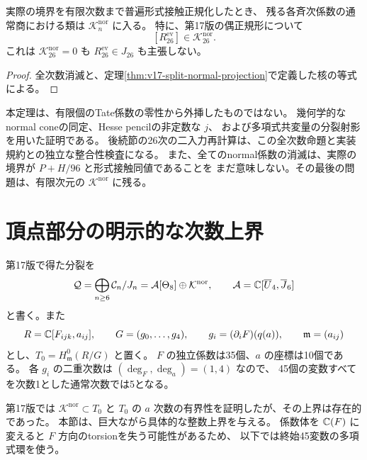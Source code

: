 \begin{corollary}[全ての実際の剰余類が入る部分]
\label{cor:v18-all-actual-classes-vertex}
実際の境界を有限次数まで普遍形式接触正規化したとき、
残る各斉次係数の通常商における類は $\mathcal K_n^{\mathrm{nor}}$ に入る。
特に、第17版の偶正規形について
\[
 [R_{26}^{\mathrm{ev}}]\in\mathcal K_{26}^{\mathrm{nor}}.
\]
これは $\mathcal K_{26}^{\mathrm{nor}}=0$ も $R_{26}^{\mathrm{ev}}\in J_{26}$ も主張しない。
\end{corollary}

\begin{proof}
全次数消滅と、定理\ref{thm:v17-split-normal-projection}で定義した核の等式による。
\end{proof}

\begin{remark}[全次数の証明と有限計算の役割]
本定理は、有限個のTate係数の零性から外挿したものではない。
幾何学的なnormal coneの同定、Hesse pencilの非定数な $j$、
および多項式共変量の分裂射影を用いた証明である。
後続節の26次の二入力再計算は、この全次数命題と実装規約との独立な整合性検査になる。
また、全てのnormal係数の消滅は、実際の境界が $P+H/96$ と形式接触同値であることを
まだ意味しない。その最後の問題は、有限次元の $\mathcal K^{\mathrm{nor}}$ に残る。
\end{remark}




\section{頂点部分の明示的な次数上界}
\label{sec:v18-effective-vertex-bound}

第17版で得た分裂を
\[
 \mathcal Q=\bigoplus_{n\ge6}\mathcal C_n/J_n
 =\mathcal A[\Theta_8]\oplus\mathcal K^{\mathrm{nor}},
 \qquad \mathcal A=\mathbb C[\overline U_4,\overline J_6]
\]
と書く。また
\[
 R=\mathbb C[F_{ijk},a_{ij}],\qquad
 G=(g_0,\ldots,g_4),\qquad g_i=(\partial_iF)(q(a)),
 \qquad\mathfrak m=(a_{ij})
\]
とし、$T_0=H^0_{\mathfrak m}(R/G)$ と置く。
$F$ の独立係数は35個、$a$ の座標は10個である。
各 $g_i$ の二重次数は $(\deg_F,\deg_a)=(1,4)$ なので、
45個の変数すべてを次数1とした通常次数では5となる。

第17版では $\mathcal K^{\mathrm{nor}}\subset T_0$ と
$T_0$ の $a$ 次数の有界性を証明したが、その上界は存在的であった。
本節は、巨大ながら具体的な整数上界を与える。
係数体を $\mathbb C(F)$ に変えると $F$ 方向のtorsionを失う可能性があるため、
以下では終始45変数の多項式環を使う。

